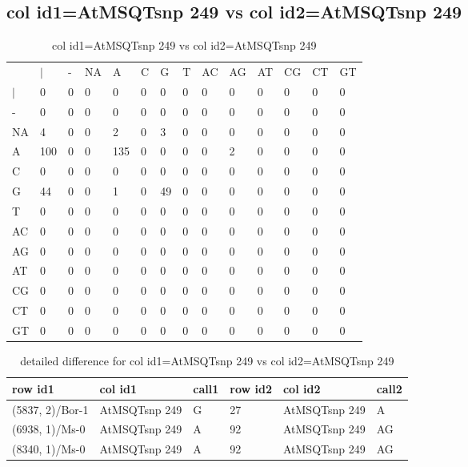 \subsection{col id1=AtMSQTsnp 249 vs col id2=AtMSQTsnp 249}
\begin{center}
\begin{longtable}{|l|l|l|l|l|l|l|l|l|l|l|l|l|l|}
\caption{col id1=AtMSQTsnp 249 vs col id2=AtMSQTsnp 249} \label{table_dm796}\\
\hline
\\
\hline
&$|$&-&NA&A&C&G&T&AC&AG&AT&CG&CT&GT\\
$|$&0&0&0&0&0&0&0&0&0&0&0&0&0\\
-&0&0&0&0&0&0&0&0&0&0&0&0&0\\
NA&4&0&0&2&0&3&0&0&0&0&0&0&0\\
A&100&0&0&135&0&0&0&0&2&0&0&0&0\\
C&0&0&0&0&0&0&0&0&0&0&0&0&0\\
G&44&0&0&1&0&49&0&0&0&0&0&0&0\\
T&0&0&0&0&0&0&0&0&0&0&0&0&0\\
AC&0&0&0&0&0&0&0&0&0&0&0&0&0\\
AG&0&0&0&0&0&0&0&0&0&0&0&0&0\\
AT&0&0&0&0&0&0&0&0&0&0&0&0&0\\
CG&0&0&0&0&0&0&0&0&0&0&0&0&0\\
CT&0&0&0&0&0&0&0&0&0&0&0&0&0\\
GT&0&0&0&0&0&0&0&0&0&0&0&0&0\\
\hline
\end{longtable}
\end{center}

\begin{center}
\begin{longtable}{|l|l|l|l|l|l|}
\caption{detailed difference for col id1=AtMSQTsnp 249 vs col id2=AtMSQTsnp 249} \label{table_dm797}\\
\hline
row id1&col id1&call1&row id2&col id2&call2\\
\hline
(5837, 2)/Bor-1&AtMSQTsnp 249&G&27&AtMSQTsnp 249&A\\
(6938, 1)/Ms-0&AtMSQTsnp 249&A&92&AtMSQTsnp 249&AG\\
(8340, 1)/Ms-0&AtMSQTsnp 249&A&92&AtMSQTsnp 249&AG\\
\hline
\end{longtable}
\end{center}

